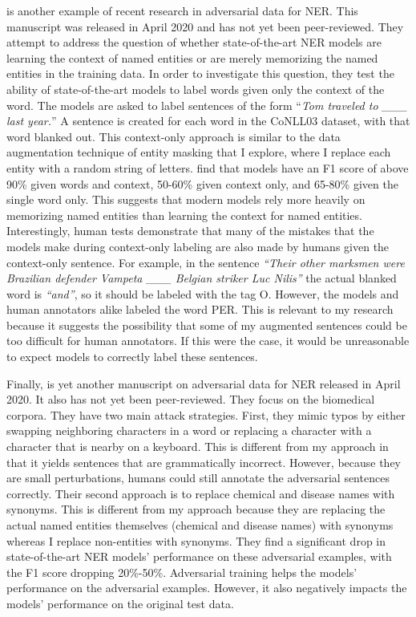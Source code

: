 \cite{interpretability} is another example of recent research in adversarial data for NER. This manuscript was released in April 2020 and has not yet been peer-reviewed. They attempt to address the question of whether state-of-the-art NER models are learning the context of named entities or are merely memorizing the named entities in the training data. In order to investigate this question, they test the ability of state-of-the-art models to label words given only the context of the word. The models are asked to label sentences of the form ``\textit{Tom traveled to \_\_\_ last year.}'' A  sentence is created for each word in the CoNLL03 dataset, with that word blanked out. This context-only approach is similar to the data augmentation technique of entity masking that I explore, where I replace each entity with a random string of letters. \cite{interpretability} find that models have an F1 score of above 90\% given words and context, 50-60\% given context only, and 65-80\% given the single word only. This suggests that modern models rely more heavily on memorizing named entities than learning the context for named entities. Interestingly, human tests demonstrate that many of the mistakes that the models make during context-only labeling are also made by humans given the context-only sentence. For example, in the sentence \textit{``Their other marksmen were Brazilian defender Vampeta \_\_\_ Belgian striker Luc Nilis''} the actual blanked word is \textit{``and''}, so it should be labeled with the tag \textsc{O}. However, the models and human annotators alike labeled the word \textsc{PER}. This is relevant to my research because it suggests the possibility that some of my augmented sentences could be too difficult for human annotators. If this were the case, it would be unreasonable to expect models to correctly label these sentences.

Finally, \cite{biomedadv} is yet another manuscript on adversarial data for NER released in April 2020. It also has not yet been peer-reviewed. They focus on the biomedical corpora. They have two main attack strategies. First, they mimic typos by either swapping neighboring characters in a word or replacing a character with a character that is nearby on a keyboard. This is different from my approach in that it yields sentences that are grammatically incorrect. However, because they are small perturbations, humans could still annotate the adversarial sentences correctly. Their second approach is to replace chemical and disease names with synonyms. This is different from my approach because they are replacing the actual named entities themselves (chemical and disease names) with synonyms whereas I replace non-entities with synonyms. They find a significant drop in state-of-the-art NER models' performance on these adversarial examples, with the F1 score dropping 20\%-50\%. Adversarial training helps the models' performance on the adversarial examples. However, it also negatively impacts the models' performance on the original test data.


